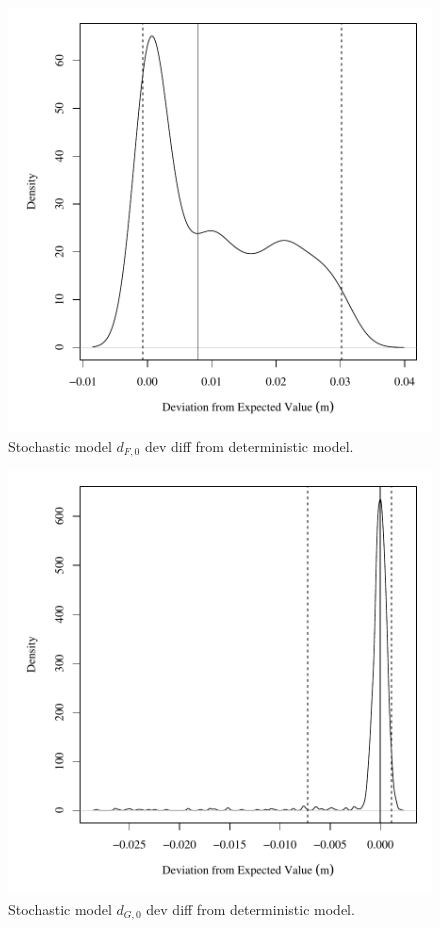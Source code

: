 \begin{center}
\begin{figure}[htbp]
	\includegraphics[width=6in]{"Figures/Results_DSR/V dev diff depthF1"}
	\caption{Stochastic model $d_{F,0}$ dev diff from deterministic model.}
\end{figure}
\end{center}
\newpage

\begin{center}
\begin{figure}[htbp]
	\includegraphics[width=6in]{"Figures/Results_DSR/V dev diff depthG1"}
	\caption{Stochastic model $d_{G,0}$ dev diff from deterministic model.}
\end{figure}
\end{center}
\newpage